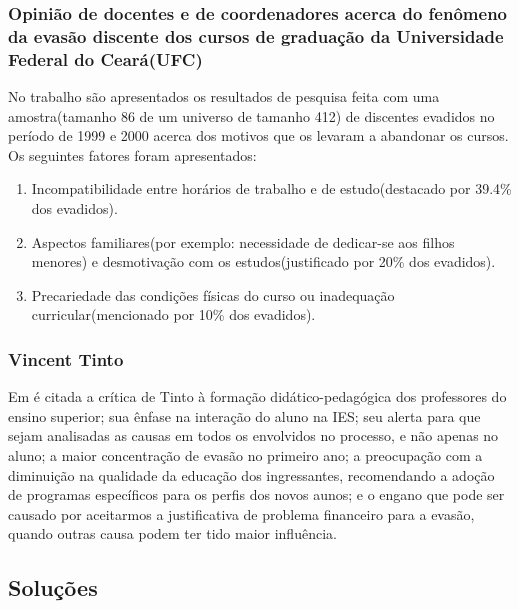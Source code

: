 \documentclass{report}
\begin{document}
\subsubsection{Opinião de docentes e de coordenadores acerca do fenômeno da evasão discente dos cursos de graduação da Universidade Federal do Ceará(UFC)}

No trabalho \cite{andriola} são apresentados os resultados de pesquisa feita com uma amostra(tamanho 86 de um universo de tamanho 412) de discentes evadidos no período de 1999 e 2000 acerca dos motivos que os levaram a abandonar os cursos. Os seguintes fatores foram apresentados:

\begin{enumerate}

\item Incompatibilidade entre horários de trabalho e de estudo(destacado por 39.4\% dos evadidos).

\item Aspectos familiares(por exemplo: necessidade de dedicar-se aos filhos menores) e desmotivação com os estudos(justificado por 20\% dos evadidos).

\item Precariedade das condições físicas do curso ou inadequação curricular(mencionado por 10\% dos evadidos).

\end{enumerate}


\subsubsection{Vincent Tinto}

Em \cite{evasao_panorama2} é citada a crítica de Tinto à formação didático-pedagógica dos professores do ensino superior; sua ênfase na interação do aluno na IES; seu alerta para que sejam analisadas as causas em todos os envolvidos no processo, e não apenas no aluno; a maior concentração de evasão no primeiro ano; a preocupação com a diminuição na qualidade da educação dos ingressantes, recomendando a adoção de programas específicos para os perfis dos novos aunos; e o engano que pode ser causado por aceitarmos a justificativa de problema financeiro para a evasão, quando outras causa podem ter tido maior influência.


\subsection{Soluções}
\end{document}
